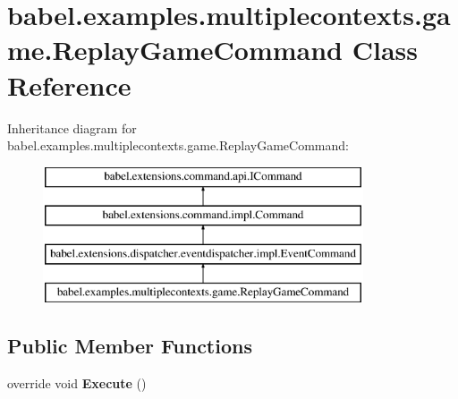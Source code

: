 \hypertarget{classbabel_1_1examples_1_1multiplecontexts_1_1game_1_1_replay_game_command}{\section{babel.\-examples.\-multiplecontexts.\-game.\-Replay\-Game\-Command Class Reference}
\label{classbabel_1_1examples_1_1multiplecontexts_1_1game_1_1_replay_game_command}
}
Inheritance diagram for babel.\-examples.\-multiplecontexts.\-game.\-Replay\-Game\-Command\-:\begin{figure}[H]
\begin{center}
\leavevmode
\includegraphics[height=4.000000cm]{classbabel_1_1examples_1_1multiplecontexts_1_1game_1_1_replay_game_command}
\end{center}
\end{figure}
\subsection*{Public Member Functions}
\begin{DoxyCompactItemize}
\item 
\hypertarget{classbabel_1_1examples_1_1multiplecontexts_1_1game_1_1_replay_game_command_a9291958d97ebcb82681eab83fa60b4da}{override void {\bfseries Execute} ()}\label{classbabel_1_1examples_1_1multiplecontexts_1_1game_1_1_replay_game_command_a9291958d97ebcb82681eab83fa60b4da}

\end{DoxyCompactItemize}
